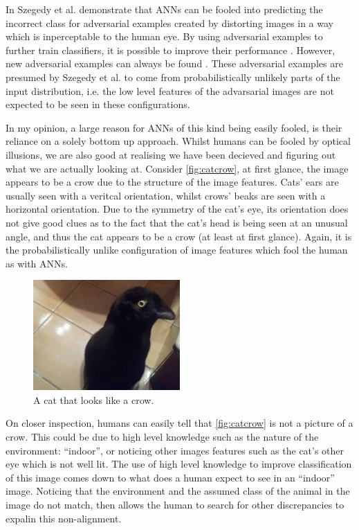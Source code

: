 In \cite{szegedy2013intriguing} Szegedy et al. demonstrate that \acp{ANN} can be fooled into predicting the incorrect class for adversarial examples created by distorting images in a way which is inperceptable to the human eye. By using adversarial examples to further train classifiers, it is possible to improve their performance \cite{moosavi2016deepfool}. However, new adversarial examples can always be found \cite{nguyen2015deep}. These adversarial examples are presumed by Szegedy et al. to come from probabilistically unlikely parts of the input distribution, i.e. the low level features of the advarsarial images are not expected to be seen in these configurations.

In my opinion, a large reason for \acp{ANN} of this kind being easily fooled, is their reliance on a solely bottom up approach. Whilst humans can be fooled by optical illusions, we are also good at realising we have been decieved and figuring out what we are actually looking at. Consider \autoref{fig:catcrow}, at first glance, the image appears to be a crow due to the structure of the image features. Cats' ears are usually seen with a veritcal orientation, whilst crows' beaks are seen with a horizontal orientation. Due to the symmetry of the cat's eye, its orientation does not give good clues as to the fact that the cat's head is being seen at an unusual angle, and thus the cat appears to be a crow (at least at first glance). Again, it is the probabilistically unlike configuration of image features which fool the human as with \acp{ANN}.

\begin{figure}
\centering
\includegraphics[width=0.5\textwidth]{Figs/litReview/catcrow.jpeg}
\caption{A cat that looks like a crow.}
\label{fig:catcrow}

\end{figure}

On closer inspection, humans can easily tell that \autoref{fig:catcrow} is not a picture of a crow. This could be due to high level knowledge such as the nature of the environment: ``indoor'', or noticing other images features such as the cat's other eye which is not well lit. The use of high level knowledge to improve classification of this image comes down to what does a human expect to see in an ``indoor'' image. Noticing that the environment and the assumed class of the animal in the image do not match, then allows the human to search for other discrepancies to expalin this non-alignment.

